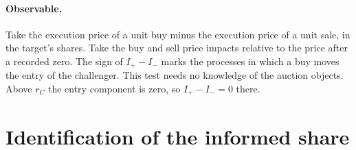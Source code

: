 \documentclass[12pt]{article}
\theoremstyle{definition}
\begin{document}
\paragraph{Observable.}
Take the execution price of a unit buy minus the execution price of a unit sale, in the target's shares.
Take the buy and sell price impacts relative to the price after a recorded zero.
The sign of $I_+-I_-$ marks the processes in which a buy moves the entry of the challenger.
This test needs no knowledge of the auction objects.
Above $r_C$ the entry component is zero, so $I_+-I_-=0$ there.

\section{Identification of the informed share}\label{sec:ident}
\end{document}
